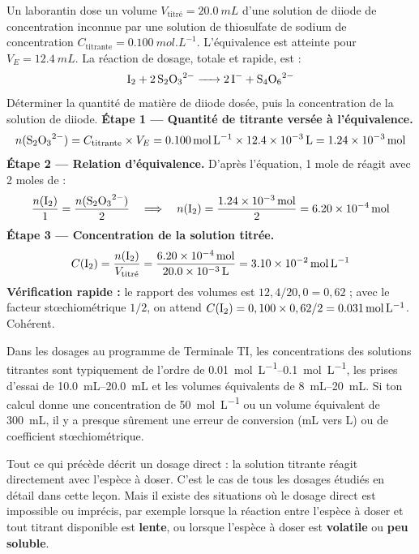 \documentclass[11pt]{article}
\newcommand{\cle}[1]{{\popxbold\color{popdark}#1}}
\newcounter{popsec}
\newcounter{popsub}
\newcommand{\courssub}[1]{%
  \stepcounter{popsub}%
  \par\vspace{9pt}\noindent{\popxbold\fontsize{11.5}{13}\selectfont\color{popink}{\color{poporange}\thepopsec.\thepopsub}\hspace{6pt}#1}\par\nopagebreak\vspace{4pt}
}
\begin{document}
\begin{exoresolu}
Un laborantin dose un volume $V_{\text{titré}} = \SI{20,0}{mL}$ d'une solution de diiode  de concentration inconnue par une solution de thiosulfate de sodium de concentration $C_{\text{titrante}} = \SI{0,100}{mol.L^{-1}}$. L'équivalence est atteinte pour $V_E = \SI{12,4}{mL}$. La réaction de dosage, totale et rapide, est :
\[ \ce{I2 + 2 S2O3^2- -> 2 I- + S4O6^2-} \]
Déterminer la quantité de matière de diiode dosée, puis la concentration de la solution de diiode.
\tcblower
\textbf{Étape 1 — Quantité de titrante versée à l'équivalence.}
\[ n(\ce{S2O3^2-}) = C_{\text{titrante}} \times V_E = \SI{0,100}{mol.L^{-1}} \times \SI{12,4e-3}{L} = \SI{1,24e-3}{mol} \]
\textbf{Étape 2 — Relation d'équivalence.} D'après l'équation, 1 mole de  réagit avec 2 moles de  :
\[ \frac{n(\ce{I2})}{1} = \frac{n(\ce{S2O3^2-})}{2} \quad\Longrightarrow\quad n(\ce{I2}) = \frac{\SI{1,24e-3}{mol}}{2} = \SI{6,20e-4}{mol} \]
\textbf{Étape 3 — Concentration de la solution titrée.}
\[ C(\ce{I2}) = \frac{n(\ce{I2})}{V_{\text{titré}}} = \frac{\SI{6,20e-4}{mol}}{\SI{20,0e-3}{L}} = \SI{3,10e-2}{mol.L^{-1}} \]
\textbf{Vérification rapide :} le rapport des volumes est $12,4/20,0 = 0,62$ ; avec le facteur stœchiométrique $1/2$, on attend $C(\ce{I2}) = 0,100 \times 0,62 / 2 = \SI{0,031}{mol.L^{-1}}$. Cohérent.
\end{exoresolu}

\begin{exemplebox}
Dans les dosages au programme de Terminale TI, les concentrations des solutions titrantes sont typiquement de l'ordre de \SIrange{0,01}{0,1}{mol.L^{-1}}, les prises d'essai de \SIrange{10,0}{20,0}{mL} et les volumes équivalents de \SIrange{8}{20}{mL}. Si ton calcul donne une concentration de \SI{50}{mol.L^{-1}} ou un volume équivalent de \SI{300}{mL}, il y a presque sûrement une erreur de conversion (mL vers L) ou de coefficient stœchiométrique.
\end{exemplebox}

\courssub{Dosage direct et dosage en retour}

Tout ce qui précède décrit un \cle{dosage direct} : la solution titrante réagit directement avec l'espèce à doser. C'est le cas de tous les dosages étudiés en détail dans cette leçon. Mais il existe des situations où le dosage direct est impossible ou imprécis, par exemple lorsque la réaction entre l'espèce à doser et tout titrant disponible est \textbf{lente}, ou lorsque l'espèce à doser est \textbf{volatile} ou \textbf{peu soluble}.
\end{document}
